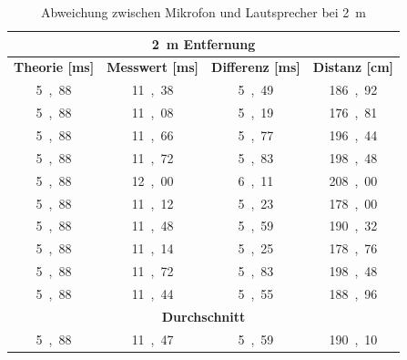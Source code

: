 \begin{table}[H]
\centering
\caption{Abweichung zwischen Mikrofon und Lautsprecher bei \SI{2}{m}}
\label{tab:modul_D_2}
\begin{tabular}{|c|c|c|c|}
\hline
\multicolumn{4}{|c|}{\textbf{\SI{2}{\m} Entfernung}}                                                                                                              \\ \hline
\textbf{Theorie [\si{ms}]} & \textbf{Messwert [\si{ms}]} & \multicolumn{1}{l|}{\textbf{Differenz [\si{ms}]}} & \multicolumn{1}{l|}{\textbf{Distanz [\si{cm}]}} \\ \hline
\si{5,88}	 & 	\si{11,38}	 & 	\si{5,49}	 & 	\si{186,92}	 \\ \hline
\si{5,88}	 & 	\si{11,08}	 & 	\si{5,19}	 & 	\si{176,81}	 \\ \hline
\si{5,88}	 & 	\si{11,66}	 & 	\si{5,77}	 & 	\si{196,44}	 \\ \hline
\si{5,88}	 & 	\si{11,72}	 & 	\si{5,83}	 & 	\si{198,48}	 \\ \hline
\si{5,88}	 & 	\si{12,00}	 & 	\si{6,11}	 & 	\si{208,00}	 \\ \hline
\si{5,88}	 & 	\si{11,12}	 & 	\si{5,23}	 & 	\si{178,00}	 \\ \hline
\si{5,88}	 & 	\si{11,48}	 & 	\si{5,59}	 & 	\si{190,32}	 \\ \hline
\si{5,88}	 & 	\si{11,14}	 & 	\si{5,25}	 & 	\si{178,76}	 \\ \hline
\si{5,88}	 & 	\si{11,72}	 & 	\si{5,83}	 & 	\si{198,48}	 \\ \hline
\si{5,88}	 & 	\si{11,44}	 & 	\si{5,55}	 & 	\si{188,96}	 \\ \hline
\multicolumn{4}{|c|}{\textbf{Durchschnitt}}                                                                                                                \\ \hline
\si{5,88}	 & 	\si{11,47}	 & 	\si{5,59}	 & 	\si{190,10}	 \\ \hline
\end{tabular}
\end{table}

